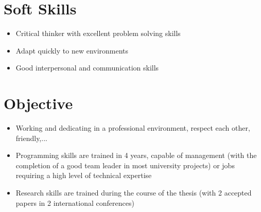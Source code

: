 \documentclass[letterpaper,11pt]{article}
\newcommand{\resumeItemNornal}[1]{
  \item\small{
    {#1 \vspace{-2pt}}
  }
}
\newcommand{\resumeSubItemNormal}[1]{\resumeItemNornal{#1}\vspace{-4pt}}
\newcommand{\resumeSubHeadingListStart}{\begin{itemize}[leftmargin=*]}
\newcommand{\resumeSubHeadingListEnd}{\end{itemize}}
\begin{document}
  
\section{Soft Skills}
  \resumeSubHeadingListStart
    \resumeSubItemNormal
      {Critical thinker with excellent problem solving skills}
    \resumeSubItemNormal
      {Adapt quickly to new environments}
  \resumeSubItemNormal
      {Good interpersonal and communication skills}
\resumeSubHeadingListEnd


\section{Objective}
  \resumeSubHeadingListStart
    \resumeSubItemNormal{Working and dedicating in a professional environment, respect each other, friendly,...}
    \resumeSubItemNormal{Programming skills are trained in 4 years, capable of management (with the completion of a good team leader in most university projects) or jobs requiring a high level of technical expertise}
    \resumeSubItemNormal{Research skills are trained during the course of the thesis (with 2 accepted papers in 2 international conferences)}
  \resumeSubHeadingListEnd

\end{document}
